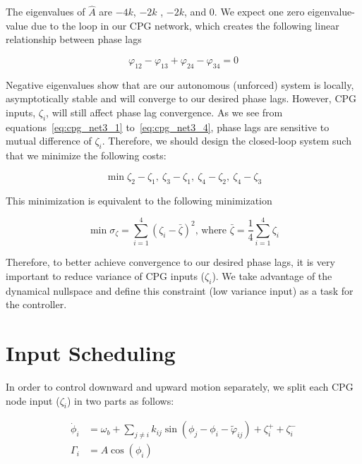 \documentclass{article}
\begin{document}
The eigenvalues of $\hat{A}$ are $-4k$, $-2k$ , $-2k$, and $0$. We expect one zero eigenvalue-value due to the loop in our CPG network, which creates the following linear relationship between phase lags

\begin{equation}
	\varphi_{12} - \varphi_{13} + \varphi_{24} - \varphi_{34} = 0
\end{equation}

Negative eigenvalues show that are our autonomous (unforced) system is locally, asymptotically stable and will converge to our desired phase lags. However, CPG inputs, $\zeta_i$, will still affect phase lag convergence. As we see from equations~\ref{eq:cpg_net3_1} to~\ref{eq:cpg_net3_4}, phase lags are sensitive to mutual difference of $\zeta_i$. Therefore, we should design the closed-loop system such that we minimize the following costs:

\begin{equation}
	\min \zeta_2-\zeta_1, \ \zeta_3-\zeta_1, \ \zeta_4-\zeta_2, \ \zeta_4-\zeta_3 
    \label{eq:one_node1}
\end{equation}

This minimization is equivalent to the following minimization

\begin{equation}	
	\min \sigma_{\zeta} = \sum\limits_{i=1}^4 \left( \zeta_i - \bar{\zeta} \right)^2 \textrm{, where } \bar{\zeta} = \frac{1}{4}\sum\limits_{i=1}^4\zeta_i
	\label{eq:one_node2}
\end{equation}

Therefore, to better achieve convergence to our desired phase lags, it is very important to reduce variance of CPG inputs ($\zeta_i$). We take advantage of the dynamical nullspace and define this constraint (low variance input) as a task for the controller.

\section*{Input Scheduling}

In order to control downward and upward motion separately, we split each CPG node input ($\zeta_i$) in two parts as follows:

\begin{align}\label{eq:one_node3}
	\dot \phi_i &= \omega_{b} + \sum_{j \neq i} k_{ij} \sin \left( \phi_j - \phi_i - \tilde{\varphi}_{ij} \right ) + \zeta_i^+ + \zeta_i^-\\
	\Gamma_i    &= A \cos(\phi_i)
\end{align}
\end{document}
